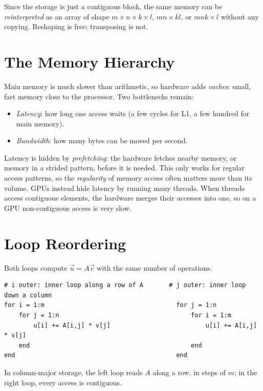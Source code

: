 Since the storage is just a contiguous block, the same memory can be \emph{reinterpreted} as an array of shape $m \times n \times k \times l$, $mn \times kl$, or $mnk \times l$ without any copying. Reshaping is free; transposing is not.

\section{The Memory Hierarchy}

Main memory is much slower than arithmetic, so hardware adds \emph{caches}: small, fast memory close to the processor. Two bottlenecks remain:
\begin{itemize}
  \item \emph{Latency}: how long one access waits (a few cycles for L1, a few hundred for main memory).
  \item \emph{Bandwidth}: how many bytes can be moved per second.
\end{itemize}
Latency is hidden by \emph{prefetching}: the hardware fetches nearby memory, or memory in a strided pattern, before it is needed. This only works for regular access patterns, so the \emph{regularity} of memory access often matters more than its volume. GPUs instead hide latency by running many threads. When threads access contiguous elements, the hardware merges their accesses into one, so on a GPU non-contiguous access is very slow.

\section{Loop Reordering}

\begin{example}
  Both loops compute $\vec{u} = A\vec{v}$ with the same number of operations.
\begin{lstlisting}
# i outer: inner loop along a row of A       # j outer: inner loop down a column
for i = 1:m                                    for j = 1:n
    for j = 1:n                                    for i = 1:m
        u[i] += A[i,j] * v[j]                          u[i] += A[i,j] * v[j]
    end                                            end
end                                            end
\end{lstlisting}
  In column-major storage, the left loop reads $A$ along a row, in steps of $m$; in the right loop, every access is contiguous.
\end{example}

